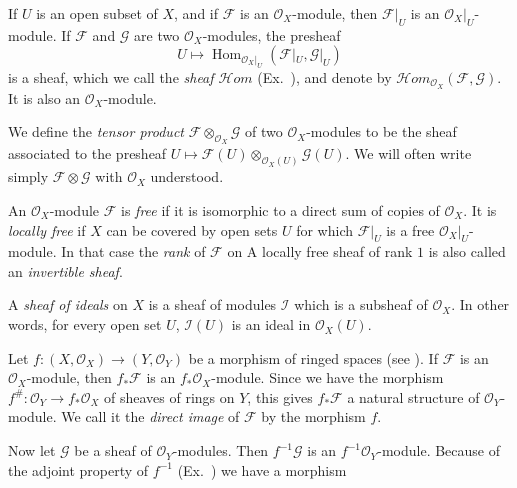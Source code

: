 {If $U$ is an open subset of $X$, and if $\mathcal F$ is an $\mathcal O_X$-module, then $\mathcal F|_U$ is an $\mathcal O_X|_U$-module. If $\mathcal F$ and $\mathcal G$ are two $\mathcal O_X$-modules, the presheaf
\[
U\mapsto\operatorname{Hom}_{\mathcal O_X|_U}(\mathcal F|_U,\mathcal G|_U)
\]
is a sheaf, which we call the \emph{sheaf $\mathcal H\!om$} (Ex.~), and denote by $\mathcal H\!om_{\mathcal O_X}(\mathcal F,\mathcal G)$. It is also an $\mathcal O_X$-module.

We define the \emph{tensor product} $\mathcal F\otimes_{\mathcal O_X}\mathcal G$ of two $\mathcal O_X$-modules to be the sheaf associated to the presheaf $U\mapsto\mathcal F(U)\otimes_{\mathcal O_X(U)}\mathcal G(U)$. We will often write simply $\mathcal F\otimes\mathcal G$ with $\mathcal O_X$ understood.

An $\mathcal O_X$-module $\mathcal F$ is \emph{free} if it is isomorphic to a direct sum of copies of $\mathcal O_X$. It is \emph{locally free} if $X$ can be covered by open sets $U$ for which $\mathcal F|_U$ is a free $\mathcal O_X|_U$-module. In that case the \emph{rank} of $\mathcal F$ on  A locally free sheaf of rank $1$ is also called an \emph{invertible sheaf}.

A \emph{sheaf of ideals} on $X$ is a sheaf of modules $\mathcal I$ which is a subsheaf of $\mathcal O_X$. In other words, for every open set $U$, $\mathcal I(U)$ is an ideal in $\mathcal O_X(U)$.

Let $f\colon(X,\mathcal O_X)\to(Y,\mathcal O_Y)$ be a morphism of ringed spaces (see ). If $\mathcal F$ is an $\mathcal O_X$-module, then $f_*\mathcal F$ is an $f_*\mathcal O_X$-module. Since we have the morphism $f^\#\colon\mathcal O_Y\to f_*\mathcal O_X$ of sheaves of rings on $Y$, this gives $f_*\mathcal F$ a natural structure of $\mathcal O_Y$-module. We call it the \emph{direct image} of $\mathcal F$ by the morphism $f$.

Now let $\mathcal G$ be a sheaf of $\mathcal O_Y$-modules. Then $f^{-1}\mathcal G$ is an $f^{-1}\mathcal O_Y$-module. Because of the adjoint property of $f^{-1}$ (Ex.~) we have a morphism
}

